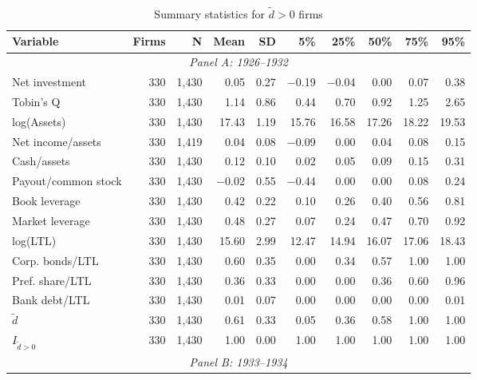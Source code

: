 \begin{table}[p]\centering
    \caption{\\ Summary statistics for $\tilde{d} > 0$ firms}\scriptsize
    \label{tabapp:summary_I_1}
    \begin{threeparttable}
        \begin{tabular}{lrrrrrrrrr}
            \toprule
            Variable & Firms & N & Mean & SD & 5\% & 25\% & 50\% & 75\% & 95\% \\
            \midrule
            \multicolumn{10}{c}{\textit{Panel A: 1926--1932}} \\
            \midrule
            Net investment & 330 & 1,430 & 0.05 & 0.27 & $-$0.19 & $-$0.04 & 0.00 & 0.07 & 0.38 \\
            Tobin's Q & 330 & 1,430 & 1.14 & 0.86 & 0.44 & 0.70 & 0.92 & 1.25 & 2.65 \\
            log(Assets) & 330 & 1,430 & 17.43 & 1.19 & 15.76 & 16.58 & 17.26 & 18.22 & 19.53 \\
            Net income/assets & 330 & 1,419 & 0.04 & 0.08 & $-$0.09 & 0.00 & 0.04 & 0.08 & 0.15 \\
            Cash/assets & 330 & 1,430 & 0.12 & 0.10 & 0.02 & 0.05 & 0.09 & 0.15 & 0.31 \\
            Payout/common stock & 330 & 1,430 & $-$0.02 & 0.55 & $-$0.44 & 0.00 & 0.00 & 0.08 & 0.24 \\
            Book leverage & 330 & 1,430 & 0.42 & 0.22 & 0.10 & 0.26 & 0.40 & 0.56 & 0.81 \\
            Market leverage & 330 & 1,430 & 0.48 & 0.27 & 0.07 & 0.24 & 0.47 & 0.70 & 0.92 \\
            log(LTL) & 330 & 1,430 & 15.60 & 2.99 & 12.47 & 14.94 & 16.07 & 17.06 & 18.43 \\
            Corp. bonds/LTL & 330 & 1,430 & 0.60 & 0.35 & 0.00 & 0.34 & 0.57 & 1.00 & 1.00 \\
            Pref. share/LTL & 330 & 1,430 & 0.36 & 0.33 & 0.00 & 0.00 & 0.36 & 0.60 & 0.96 \\
            Bank debt/LTL & 330 & 1,430 & 0.01 & 0.07 & 0.00 & 0.00 & 0.00 & 0.00 & 0.01 \\
            \ensuremath{\tilde{d}} & 330 & 1,430 & 0.61 & 0.33 & 0.05 & 0.36 & 0.58 & 1.00 & 1.00 \\
            \ensuremath{I_{\tilde{d}>0}} & 330 & 1,430 & 1.00 & 0.00 & 1.00 & 1.00 & 1.00 & 1.00 & 1.00 \\
            \midrule
            \multicolumn{10}{c}{\textit{Panel B: 1933--1934}} \\

\end{tabular}
\end{threeparttable}
\end{table}

